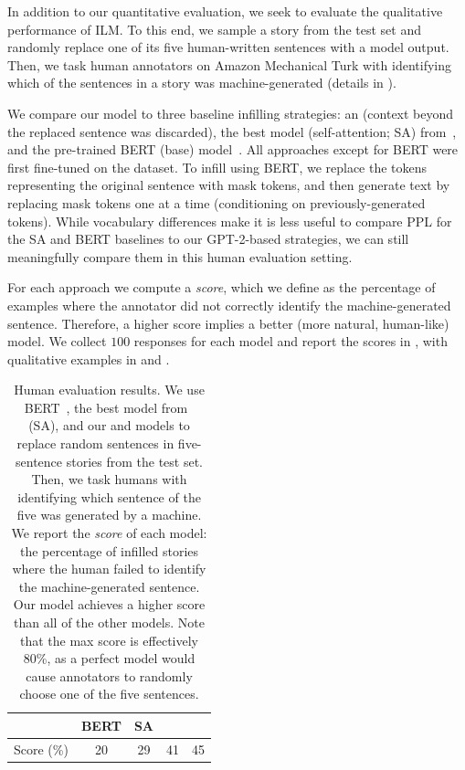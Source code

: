 In addition to our quantitative evaluation, we seek to evaluate the qualitative performance of ILM. 
To this end, we sample a story from the \stories{} test set and randomly replace one of its five human-written sentences with a model output. 
Then, we task human annotators on Amazon Mechanical Turk with identifying which of the sentences in a story was machine-generated (details in ).

We compare our \ilm{} model to three baseline infilling strategies: 
an \lm{} (context beyond the replaced sentence was discarded), 
the best model (self-attention; SA) from~\citet{zhu2019text},
and the pre-trained BERT (base) model~\citep{devlin2019bert}.
All approaches except for BERT were first fine-tuned on the \stories{} dataset. 
To infill using BERT, we replace the tokens representing the original sentence with mask tokens, and then generate text by replacing mask tokens one at a time (conditioning on previously-generated tokens). 
While vocabulary differences make it is less useful to compare PPL for the SA and BERT baselines to our GPT-2-based strategies, 
we can still meaningfully compare them in this human evaluation setting.

For each approach we compute a \emph{score}, 
which we define as the percentage of examples where the annotator did not correctly identify the machine-generated sentence. 
Therefore, a higher score implies a better (more natural, human-like) model.
We collect $100$ responses for each model and report the scores in , with qualitative examples in  and . 

\begin{table}[t]
    \centering
    \begin{tabular}[t]{ccccc}
        \toprule
        & BERT  & SA    & \lm{}  & \ilm{} \\
        \midrule
Score (\%)   & 20    & 29    & 41        & 45 \\
        \bottomrule
    \end{tabular}
    \caption{
Human evaluation results.
We use BERT~\citep{devlin2019bert}, the best model from~\citet{zhu2019text} (SA), and our \lm{} and \ilm{} models to replace random sentences in five-sentence stories from the \stories{} test set. 
Then, we task humans with identifying which sentence of the five was generated by a machine. 
We report the \emph{score} of each model: the percentage of infilled stories where the human failed to identify the machine-generated sentence. 
Our \ilm{} model achieves a higher score than all of the other models. 
Note that the max score is effectively 80\%, as a perfect model would cause annotators to randomly choose one of the five sentences.
}
    \label{tab:humaneval}
\end{table}

